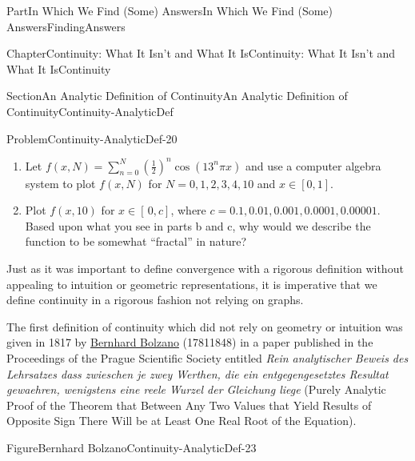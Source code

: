 \documentclass[oneside,10pt,]{book}
\numberwithin{equation}{part}
\begin{document}
\begin{partptx}{Part}{In Which We Find (Some) Answers}{}{In Which We Find (Some) Answers}{}{}{FindingAnswers}
\begin{chapterptx}{Chapter}{Continuity: What It Isn't and What It Is}{}{Continuity: What It Isn't and What It Is}{}{}{Continuity}
\begin{sectionptx}{Section}{An Analytic Definition of Continuity}{}{An Analytic Definition of Continuity}{}{}{Continuity-AnalyticDef}
\begin{problem}{Problem}{}{Continuity-AnalyticDef-20}
\begin{enumerate}[font=\bfseries,label=(\alph*),ref=\alph*]
x\right)\), what is the smallest value of \(a\) for which \(f\) satisfies Weierstrass' criterion to be continuous and nowhere differentiable.%
\item{}Let \(f(x,N)=\sum_{n=0}^N\left(\frac{1}{2}\right)^n\cos\left(13^n\pi
x\right)\) and use a computer algebra system to plot \(f(x,N)\) for \(N=0,1,2,3,4,10\) and \(x\in[0,1]\).%
\item{}Plot \(f(x,10)\) for \(x\in[\,0,c]\), where \(c=0.1,0.01,0.001,0.0001,0.00001\).  Based upon what you see in parts b and c, why would we describe the function to be somewhat ``fractal'' in nature?%
\end{enumerate}%
\end{problem}
Just as it was important to define convergence with a rigorous definition without appealing to intuition or geometric representations, it is imperative that we define continuity in a rigorous fashion not relying on graphs.%
\par
{} The first definition of continuity which did not rely on geometry or intuition was given in 1817 by \href{https://mathshistory.st-andrews.ac.uk/Biographies/Bolzano/}{Bernhard Bolzano} (1781\textendash{}1848) in a paper published in the Proceedings of the Prague Scientific Society entitled \textit{Rein analytischer Beweis des Lehrsatzes dass zwieschen je zwey Werthen, die ein entgegengesetztes Resultat gewaehren, wenigstens eine reele Wurzel der Gleichung liege} (Purely Analytic Proof of the Theorem that Between Any Two Values that Yield Results of Opposite Sign There Will be at Least One Real Root of the Equation).%
\begin{figureptx}{Figure}{Bernhard Bolzano}{Continuity-AnalyticDef-23}{}%
%
%
\begin{image}{0.325}{0.35}{0.325}{}%

\end{image}
\end{figureptx}
\end{sectionptx}
\end{chapterptx}
\end{partptx}
\end{document}
